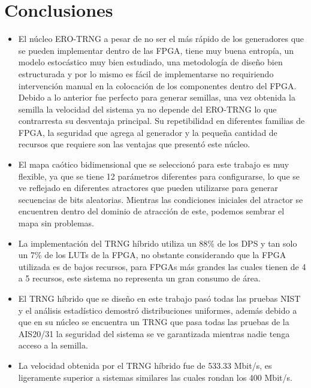 \chapter{Conclusiones}

    \begin{itemize}
        \item El núcleo ERO-TRNG a pesar de no ser el más rápido de los generadores que se pueden implementar dentro de las FPGA, tiene muy buena entropía, un modelo estocástico muy bien estudiado, una metodología de diseño bien estructurada y por lo mismo es fácil de implementarse no requiriendo intervención manual en la colocación de los componentes dentro del FPGA. Debido a lo anterior fue perfecto para generar semillas, una vez obtenida la semilla la velocidad del sistema ya no depende del ERO-TRNG lo que contrarresta su desventaja principal. Su repetibilidad en diferentes familias de FPGA, la seguridad que agrega al generador y la pequeña cantidad de recursos que requiere son las ventajas que presentó este núcleo.

        \item El mapa caótico bidimensional que se seleccionó para este trabajo es muy flexible, ya que se tiene 12 parámetros diferentes para configurarse, lo que se ve reflejado en diferentes atractores que pueden utilizarse para generar secuencias de bits aleatorias. Mientras las condiciones iniciales del atractor se encuentren dentro del dominio de atracción de este, podemos sembrar el mapa sin problemas. 

        \item La implementación del TRNG híbrido utiliza un 88\% de los DPS y tan solo un 7\% de los LUTs de la FPGA, no obstante considerando que la FPGA utilizada es de bajos recursos, para FPGAs más grandes las cuales tienen de 4 a 5 recursos, este sistema no representa un gran consumo de área.

        \item El TRNG híbrido que se diseño en este trabajo pasó todas las pruebas NIST y el análisis estadístico demostró distribuciones uniformes, además debido a que en su núcleo se encuentra un TRNG que pasa todas las pruebas de la AIS20/31 la seguridad del sistema se ve garantizada mientras nadie tenga acceso a la semilla.

        \item La velocidad obtenida por el TRNG híbrido fue de 533.33 Mbit/s, es ligeramente superior a sistemas similares las cuales rondan los 400 Mbit/s.

    \end{itemize}
    
